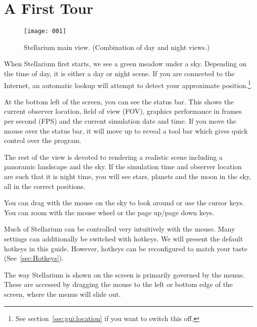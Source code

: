 

\chapter{A First Tour}
\label{ch:tour}


\begin{figure}[tbh]\centering
\texttt{[image: 001]}
\caption{Stellarium main view. (Combination of day and night views.)}
\label{fig:001}
\end{figure}

\noindent When Stellarium first starts, we see a green meadow under a
sky. Depending on the time of day, it is either a day or night
scene. If you are connected to the Internet, an automatic lookup will
attempt to detect your approximate position.\footnote{See
  section~\ref{sec:gui:location} if you want to switch this off.}

At the bottom left of the screen, you can see the status bar. This shows
the current observer location, field of view (FOV), graphics performance
in frames per second (FPS) and the current simulation date and time.
If you move the mouse over the status bar, it will move up to reveal a
tool bar which gives quick control over the program.

The rest of the view is devoted to rendering a realistic scene including
a panoramic landscape and the sky. If the simulation time and observer
location are such that it is night time, you will see stars, planets and
the moon in the sky, all in the correct positions.

You can drag with the mouse on the sky to look around or use the cursor
keys. You can zoom with the mouse wheel or the page up/page down keys.

Much of Stellarium can be controlled very intuitively with the
mouse. Many settings can additionally be switched with hotkeys. We
will present the default hotkeys in this guide. However, hotkeys can
be reconfigured to match your taste (See~\ref{sec:Hotkeys}).

The way Stellarium is shown on the screen is primarily governed by the
menus. These are accessed by dragging the mouse to the left or bottom
edge of the screen, where the menus will slide out.



